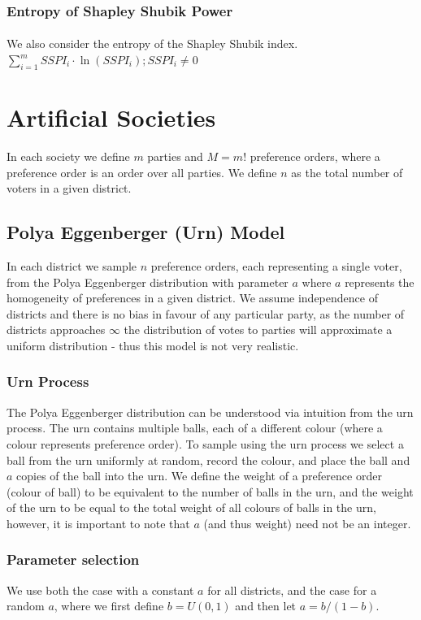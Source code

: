 \documentclass{article}
\begin{document}
\subsubsection{Entropy of Shapley Shubik Power}
\label{sec:entropysspi}
\paragraph{}
We also consider the entropy of the Shapley Shubik index. $\sum_{i=1}^m SSPI_i \cdot \ln(SSPI_i); SSPI_i \neq 0$
\section{Artificial Societies}
In each society we define $m$ parties and $M=m!$ preference orders, where a preference order is an order over all parties.
We define $n$ as the total number of voters in a given district.

\subsection{Polya Eggenberger (Urn) Model}
In each district we sample $n$ preference orders, each representing a single voter, from the Polya Eggenberger distribution with parameter $a$ where $a$ represents the homogeneity of preferences in a given district. We assume independence of districts and there is no bias in favour of any particular party, as the number of districts approaches $\infty$ the distribution of votes to parties will approximate a uniform distribution - thus this model is not very realistic.

\subsubsection{Urn Process}
The Polya Eggenberger distribution can be understood via intuition from the urn process. The urn contains multiple balls, each of a different colour (where a colour represents preference order). To sample using the urn process we select a ball from the urn uniformly at random, record the colour, and place the ball and $a$ copies of the ball into the urn. We define the weight of a preference order (colour of ball) to be equivalent to the number of balls in the urn, and the weight of the urn to be equal to the total weight of all colours of balls in the urn, however, it is important to note that $a$ (and thus weight) need not be an integer.
\subsubsection{Parameter selection}
We use both the case with a constant $a$ for all districts, and the case for a random $a$, where we first define $b=U(0,1)$ and then let $a=b/(1-b)$.
\end{document}
